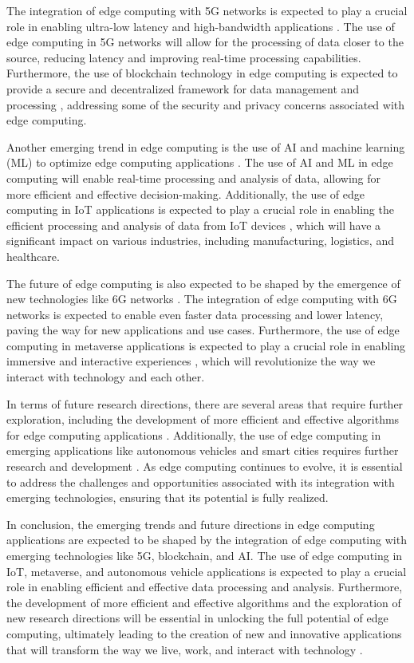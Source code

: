\documentclass[11pt]{article}
\begin{document}
The integration of edge computing with 5G networks is expected to play a crucial role in enabling ultra-low latency and high-bandwidth applications \cite{ref19}. The use of edge computing in 5G networks will allow for the processing of data closer to the source, reducing latency and improving real-time processing capabilities. Furthermore, the use of blockchain technology in edge computing is expected to provide a secure and decentralized framework for data management and processing \cite{ref55}, addressing some of the security and privacy concerns associated with edge computing.

Another emerging trend in edge computing is the use of AI and machine learning (ML) to optimize edge computing applications \cite{ref14}. The use of AI and ML in edge computing will enable real-time processing and analysis of data, allowing for more efficient and effective decision-making. Additionally, the use of edge computing in IoT applications is expected to play a crucial role in enabling the efficient processing and analysis of data from IoT devices \cite{ref13}, which will have a significant impact on various industries, including manufacturing, logistics, and healthcare.

The future of edge computing is also expected to be shaped by the emergence of new technologies like 6G networks \cite{ref56}. The integration of edge computing with 6G networks is expected to enable even faster data processing and lower latency, paving the way for new applications and use cases. Furthermore, the use of edge computing in metaverse applications is expected to play a crucial role in enabling immersive and interactive experiences \cite{ref57}, which will revolutionize the way we interact with technology and each other.

In terms of future research directions, there are several areas that require further exploration, including the development of more efficient and effective algorithms for edge computing applications \cite{ref58}. Additionally, the use of edge computing in emerging applications like autonomous vehicles and smart cities requires further research and development \cite{ref59}. As edge computing continues to evolve, it is essential to address the challenges and opportunities associated with its integration with emerging technologies, ensuring that its potential is fully realized.

In conclusion, the emerging trends and future directions in edge computing applications are expected to be shaped by the integration of edge computing with emerging technologies like 5G, blockchain, and AI. The use of edge computing in IoT, metaverse, and autonomous vehicle applications is expected to play a crucial role in enabling efficient and effective data processing and analysis. Furthermore, the development of more efficient and effective algorithms and the exploration of new research directions will be essential in unlocking the full potential of edge computing, ultimately leading to the creation of new and innovative applications that will transform the way we live, work, and interact with technology \cite{ref60}.
\end{document}
